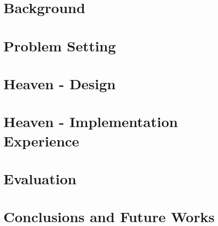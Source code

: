 \documentclass[12pt,a4paper,twoside,openright,table,xcdraw]{report}
\begin{document}
\chapter{Background}
\label{chap:background}


\chapter{Problem Setting}
\label{chap:problem-settings}



\chapter{Heaven - Design}
\label{chap:heaven}



\chapter{Heaven - Implementation Experience}
\label{chap:implementation-experience}





\chapter{Evaluation}
\label{chap:evaluation}


\chapter{Conclusions and Future Works}
\label{chap:conclusions}

\end{document}
